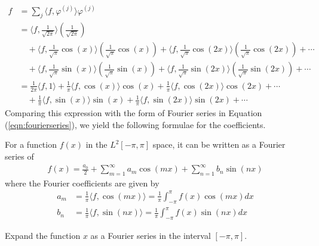 \begin{align*}
f &= \sum_{j} \langle f, \varphi^{(j)} \rangle \varphi^{(j)} \\ 
&= \langle f, \frac{1}{\sqrt{2\pi}} \rangle (\frac{1}{\sqrt{2\pi}})\\
&\quad + \langle f, \frac{1}{\sqrt{\pi}}\cos(x) \rangle (\frac{1}{\sqrt{\pi}}\cos(x)) + \langle f, \frac{1}{\sqrt{\pi}}\cos(2x) \rangle (\frac{1}{\sqrt{\pi}}\cos(2x)) + \cdots \\
&\quad + \langle f, \frac{1}{\sqrt{\pi}}\sin(x) \rangle (\frac{1}{\sqrt{\pi}}\sin(x)) + \langle f, \frac{1}{\sqrt{\pi}}\sin(2x) \rangle (\frac{1}{\sqrt{\pi}}\sin(2x)) + \cdots \\
&= \frac{1}{2\pi} \langle f, 1 \rangle + \frac{1}{\pi} \langle f, \cos(x) \rangle \cos(x) + \frac{1}{\pi} \langle f, \cos(2x) \rangle \cos(2x) + \cdots \\
&\quad + \frac{1}{\pi}\langle f, \sin(x) \rangle \sin(x) + \frac{1}{\pi}\langle f, \sin(2x) \rangle \sin(2x) + \cdots
\end{align*}
Comparing this expression with the form of Fourier series in Equation (\ref{eqn:fourierseries}), we yield the following formulae for the coefficients.
\begin{proper}
\label{proper:fourierseries}
For a function $f(x)$ in the $L^2[-\pi, \pi]$ space, it can be written as a Fourier series of
\begin{align}
f(x) = \frac{a_0}{2} + \sum_{m=1}^{\infty} a_m \cos(mx) + \sum_{n=1}^{\infty} b_n \sin(nx) \label{eqn:fourierseri}
\end{align}
where the Fourier coefficients are given by
\begin{subequations}
\begin{align}
a_m &= \frac{1}{\pi}\langle f, \cos(mx) \rangle = \frac{1}{\pi} \int_{-\pi}^{\pi} f(x)\cos(mx) dx \label{eqn:fouriera} \\
b_n &= \frac{1}{\pi}\langle f, \sin(nx) \rangle = \frac{1}{\pi} \int_{-\pi}^{\pi} f(x)\sin(nx) dx \label{eqn:fourierb}
\end{align}    
\end{subequations}
\end{proper}
\begin{exmp}
\label{exmp:fourierx}
Expand the function $x$ as a Fourier series in the interval $[-\pi, \pi]$.
\end{exmp}
